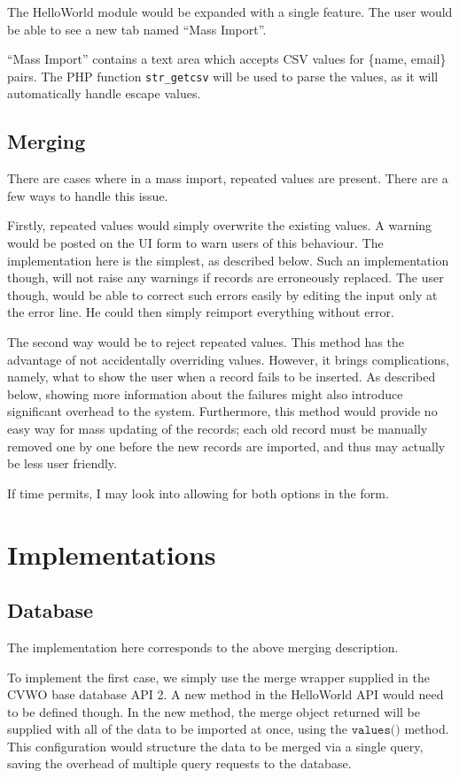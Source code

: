 \documentclass[12pt]{article}
\begin{document}
The HelloWorld module would be expanded with a single feature. The user would be able to see a new tab named ``Mass Import''.

``Mass Import'' contains a text area which accepts CSV values for \{name, email\} pairs. The PHP function \texttt{str\_getcsv} will be used to parse the values, as it will automatically handle escape values.

\subsection*{Merging}

There are cases where in a mass import, repeated values are present. There are a few ways to handle this issue.

Firstly, repeated values would simply overwrite the existing values. A warning would be posted on the UI form to warn users of this behaviour. The implementation here is the simplest, as described below. Such an implementation though, will not raise any warnings if records are erroneously replaced. The user though, would be able to correct such errors easily by editing the input only at the error line. He could then simply reimport everything without error.

The second way would be to reject repeated values. This method has the advantage of not accidentally overriding values. However, it brings complications, namely, what to show the user when a record fails to be inserted. As described below, showing more information about the failures might also introduce significant overhead to the system. Furthermore, this method would provide no easy way for mass updating of the records; each old record must be manually removed one by one before the new
records are imported, and thus may actually be less user friendly.

If time permits, I may look into allowing for both options in the form.

\section*{Implementations}

\subsection*{Database}

The implementation here corresponds to the above merging description.

To implement the first case, we simply use the merge wrapper supplied in the CVWO base database API 2. A new method in the HelloWorld API would need to be defined though. In the new method, the merge object returned will be supplied with all of the data to be imported at once, using the $\texttt{values()}$ method. This configuration would structure the data to be merged via a single query, saving the overhead of multiple query requests to the database.
\end{document}
